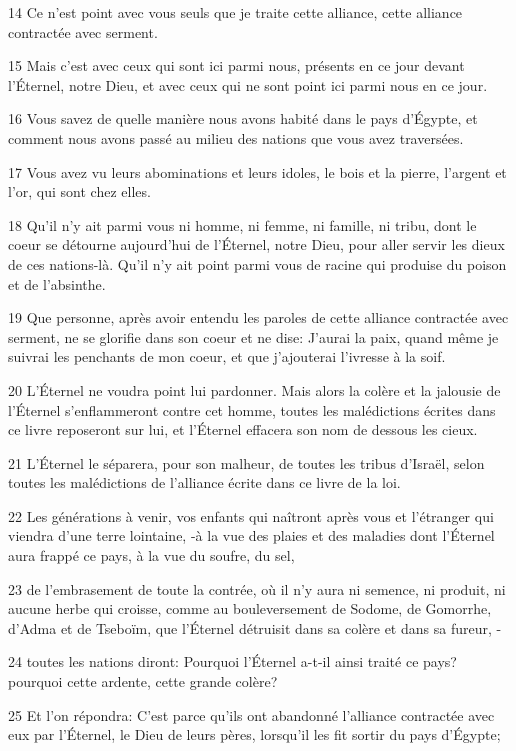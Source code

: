 \par 14 Ce n'est point avec vous seuls que je traite cette alliance, cette alliance contractée avec serment.
\par 15 Mais c'est avec ceux qui sont ici parmi nous, présents en ce jour devant l'Éternel, notre Dieu, et avec ceux qui ne sont point ici parmi nous en ce jour.
\par 16 Vous savez de quelle manière nous avons habité dans le pays d'Égypte, et comment nous avons passé au milieu des nations que vous avez traversées.
\par 17 Vous avez vu leurs abominations et leurs idoles, le bois et la pierre, l'argent et l'or, qui sont chez elles.
\par 18 Qu'il n'y ait parmi vous ni homme, ni femme, ni famille, ni tribu, dont le coeur se détourne aujourd'hui de l'Éternel, notre Dieu, pour aller servir les dieux de ces nations-là. Qu'il n'y ait point parmi vous de racine qui produise du poison et de l'absinthe.
\par 19 Que personne, après avoir entendu les paroles de cette alliance contractée avec serment, ne se glorifie dans son coeur et ne dise: J'aurai la paix, quand même je suivrai les penchants de mon coeur, et que j'ajouterai l'ivresse à la soif.
\par 20 L'Éternel ne voudra point lui pardonner. Mais alors la colère et la jalousie de l'Éternel s'enflammeront contre cet homme, toutes les malédictions écrites dans ce livre reposeront sur lui, et l'Éternel effacera son nom de dessous les cieux.
\par 21 L'Éternel le séparera, pour son malheur, de toutes les tribus d'Israël, selon toutes les malédictions de l'alliance écrite dans ce livre de la loi.
\par 22 Les générations à venir, vos enfants qui naîtront après vous et l'étranger qui viendra d'une terre lointaine, -à la vue des plaies et des maladies dont l'Éternel aura frappé ce pays, à la vue du soufre, du sel,
\par 23 de l'embrasement de toute la contrée, où il n'y aura ni semence, ni produit, ni aucune herbe qui croisse, comme au bouleversement de Sodome, de Gomorrhe, d'Adma et de Tseboïm, que l'Éternel détruisit dans sa colère et dans sa fureur, -
\par 24 toutes les nations diront: Pourquoi l'Éternel a-t-il ainsi traité ce pays? pourquoi cette ardente, cette grande colère?
\par 25 Et l'on répondra: C'est parce qu'ils ont abandonné l'alliance contractée avec eux par l'Éternel, le Dieu de leurs pères, lorsqu'il les fit sortir du pays d'Égypte;
